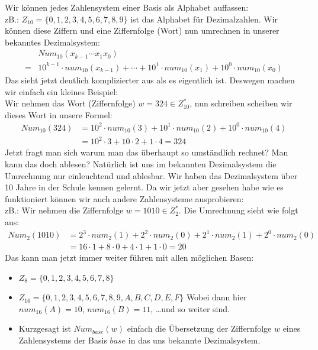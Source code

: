\documentclass[12pt]{article}
\begin{document}
\begin{flushleft}
    Wir können jedes Zahlensystem einer Basis als Alphabet auffassen: \\
    zB.: $Z_{10} = \{0,1,2,3,4,5,6,7,8,9\}$ ist das Alphabet für Dezimalzahlen.
    Wir können diese Ziffern und eine Ziffernfolge (Wort) nun umrechnen in unserer bekanntes Dezimalsystem:
    \begin{align*}
        &Num_{10}(x_{k - 1} \cdots x_1x_0) \\
        =&10^{k-1} \cdot num_{10}(x_{k-1}) + \cdots + 10^1 \cdot num_{10}(x_1) + 10^0 \cdot num_{10}(x_0)
    \end{align*}
    Das sieht jetzt deutlich komplizierter aus als es eigentlich ist. Deswegen machen wir einfach ein kleines Beispiel: \\
    Wir nehmen das Wort (Ziffernfolge) $w = 324 \in Z_{10}^{\ast}$, nun schreiben scheiben wir dieses Wort in unsere Formel: 
    \begin{align*}
        Num_{10}(324) &= 10^2 \cdot num_{10}(3) + 10^1 \cdot num_{10}(2) + 10^0 \cdot num_{10}(4) \\
        &= 10^2 \cdot 3 + 10 \cdot 2 + 1 \cdot 4 = 324
    \end{align*} 
    Jetzt fragt man sich warum man das überhaupt so umständlich rechnet? Man kann das doch ablesen? 
    Natürlich ist uns im bekannten Dezimalsystem die Umrechnung nur einleuchtend und ablesbar. Wir haben das Dezimalsystem über 10 Jahre in der Schule kennen gelernt.
    Da wir jetzt aber gesehen habe wie es funktioniert können wir auch andere Zahlensysteme ausprobieren: \\
    zB.: Wir nehmen die Ziffernfolge $w = 1010 \in Z_2^{\ast}$. Die Umrechnung sieht wie folgt aus:
    \begin{align*}
        Num_2(1010) &= 2^3 \cdot num_2(1) + 2^2 \cdot num_2(0) + 2^1 \cdot num_2(1) + 2^0 \cdot num_2(0) \\
        &= 16 \cdot 1 + 8 \cdot 0 + 4 \cdot 1 + 1 \cdot 0 = 20
    \end{align*}
    Das kann man jetzt immer weiter führen mit allen möglichen Basen:
    \begin{itemize}
        \item $Z_{8} = \{0,1,2,3,4,5,6,7,8\}$
        \item $Z_{16} = \{0,1,2,3,4,5,6,7,8,9,A,B,C,D,E,F\}$
        Wobei dann hier $num_{16}(A) = 10$, $num_{16}(B) = 11$, \dots und so weiter sind.
        \item Kurzgesagt ist $Num_{base}(w)$ einfach die Übersetzung der Ziffernfolge $w$ eines Zahlensystems der Basis $base$ in das uns bekannte Dezimalsystem.

\end{itemize}
\end{flushleft}
\end{document}
